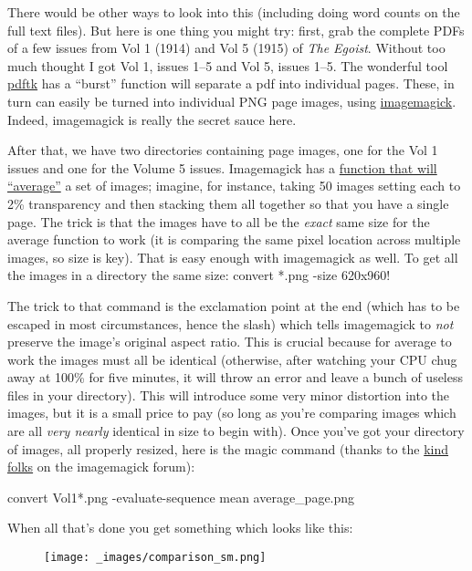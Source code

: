 \documentclass[
  12pt,
]{article}
\begin{document}
There would be other ways to look into this (including doing word counts
on the full text files). But here is one thing you might try: first,
grab the complete PDFs of a few issues from Vol 1 (1914) and Vol 5
(1915) of \emph{The Egoist}. Without too much thought I got Vol 1,
issues 1--5 and Vol 5, issues 1--5. The wonderful tool
\href{http://www.pdflabs.com/tools/pdftk-the-pdf-toolkit/}{pdftk} has a
``burst'' function will separate a pdf into individual pages. These, in
turn can easily be turned into individual PNG page images, using
\href{http://www.imagemagick.org/script/index.php}{imagemagick}. Indeed,
imagemagick is really the secret sauce here.

After that, we have two directories containing page images, one for the
Vol 1 issues and one for the Volume 5 issues. Imagemagick has a
\href{http://www.imagemagick.org/Usage/layers/\#evaluate-sequence}{function
that will ``average''} a set of images; imagine, for instance, taking 50
images setting each to 2\% transparency and then stacking them all
together so that you have a single page. The trick is that the images
have to all be the \emph{exact} same size for the average function to
work (it is comparing the same pixel location across multiple images, so
size is key). That is easy enough with imagemagick as well. To get all
the images in a directory the same size: convert *.png -size 620x960!

The trick to that command is the exclamation point at the end (which has
to be escaped in most circumstances, hence the slash) which tells
imagemagick to \emph{not} preserve the image's original aspect ratio.
This is crucial because for average to work the images must all be
identical (otherwise, after watching your CPU chug away at 100\% for
five minutes, it will throw an error and leave a bunch of useless files
in your directory). This will introduce some very minor distortion into
the images, but it is a small price to pay (so long as you're comparing
images which are all \emph{very nearly} identical in size to begin
with). Once you've got your directory of images, all properly resized,
here is the magic command (thanks to the
\href{http://www.imagemagick.org/discourse-server/viewtopic.php?f=1\&t=19754}{kind
folks} on the imagemagick forum):

convert Vol1*.png -evaluate-sequence mean average\_page.png

When all that's done you get something which looks like this:

\par\begin{figure}\centering\texttt{[image: \_images/comparison\_sm.png]}\caption{}\end{figure}
\end{document}
